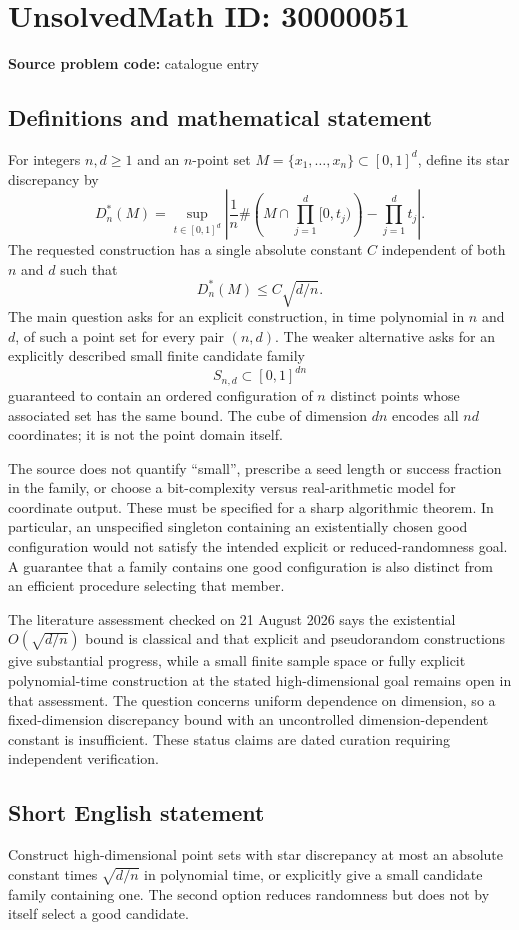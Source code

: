 \documentclass[11pt]{article}
\begin{document}
\section*{UnsolvedMath ID: 30000051}
\textbf{Source problem code:} catalogue entry
\subsection{Definitions and mathematical statement}
For integers $n,d\ge1$ and an $n$-point set $M=\{x_1,\ldots,x_n\}\subset[0,1]^d$, define its star discrepancy by
\[
 D_n^*(M)=\sup_{t\in[0,1]^d}
 \left|\frac1n\#\left(M\cap\prod_{j=1}^d[0,t_j)\right)
                     -\prod_{j=1}^dt_j\right|.
\]
The requested construction has a single absolute constant $C$ independent of both $n$ and $d$ such that
\[
 D_n^*(M)\le C\sqrt{d/n}.
\]
The main question asks for an explicit construction, in time polynomial in $n$ and $d$, of such a point set for every pair $(n,d)$. The weaker alternative asks for an explicitly described small finite candidate family
\[
 S_{n,d}\subset[0,1]^{dn}
\]
guaranteed to contain an ordered configuration of $n$ distinct points whose associated set has the same bound. The cube of dimension $dn$ encodes all $nd$ coordinates; it is not the point domain itself.

The source does not quantify ``small'', prescribe a seed length or success fraction in the family, or choose a bit-complexity versus real-arithmetic model for coordinate output. These must be specified for a sharp algorithmic theorem. In particular, an unspecified singleton containing an existentially chosen good configuration would not satisfy the intended explicit or reduced-randomness goal. A guarantee that a family contains one good configuration is also distinct from an efficient procedure selecting that member.

The literature assessment checked on 21 August 2026 says the existential $O(\sqrt{d/n})$ bound is classical and that explicit and pseudorandom constructions give substantial progress, while a small finite sample space or fully explicit polynomial-time construction at the stated high-dimensional goal remains open in that assessment. The question concerns uniform dependence on dimension, so a fixed-dimension discrepancy bound with an uncontrolled dimension-dependent constant is insufficient. These status claims are dated curation requiring independent verification.
\subsection{Short English statement}
Construct high-dimensional point sets with star discrepancy at most an absolute constant times $\sqrt{d/n}$ in polynomial time, or explicitly give a small candidate family containing one. The second option reduces randomness but does not by itself select a good candidate.
\end{document}
